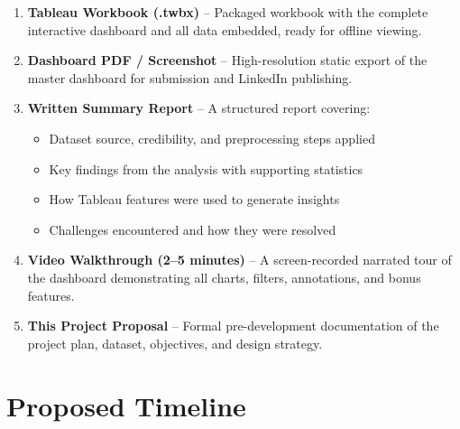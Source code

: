 \documentclass[12pt,a4paper]{article}
\begin{document}
\begin{enumerate}[leftmargin=2em, itemsep=6pt]
  \item \textbf{Tableau Workbook (.twbx)} -- Packaged workbook with the complete
        interactive dashboard and all data embedded, ready for offline viewing.

  \item \textbf{Dashboard PDF / Screenshot} -- High-resolution static export of the
        master dashboard for submission and LinkedIn publishing.

  \item \textbf{Written Summary Report} -- A structured report covering:
        \begin{itemize}[itemsep=2pt]
          \item Dataset source, credibility, and preprocessing steps applied
          \item Key findings from the analysis with supporting statistics
          \item How Tableau features were used to generate insights
          \item Challenges encountered and how they were resolved
        \end{itemize}

  \item \textbf{Video Walkthrough (2--5 minutes)} -- A screen-recorded narrated tour
        of the dashboard demonstrating all charts, filters, annotations, and bonus features.

  \item \textbf{This Project Proposal} -- Formal pre-development documentation of the
        project plan, dataset, objectives, and design strategy.
\end{enumerate}

\section{Proposed Timeline}
\end{document}
